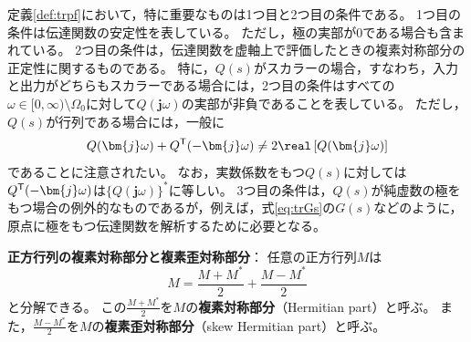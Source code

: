 \documentclass[tombow,dvipdfmx]{corona-a5-1.1}
\begin{document}
定義\ref{def:trpf}において，特に重要なものは1つ目と2つ目の条件である。
1つ目の条件は伝達関数の安定性を表している。
ただし，極の実部が0である場合も含まれている。
2つ目の条件は，伝達関数を虚軸上で評価したときの複素対称部分の正定性に関するものである。
特に，$Q(s)$がスカラーの場合，すなわち，入力と出力がどちらもスカラーである場合には，2つ目の条件はすべての$\omega \in [0,\infty)\setminus \Omega_0$に対して$Q(\bm{j}\omega)$の実部が非負であることを表している。
ただし，$Q(s)$が行列である場合には，一般に
\begin{align*}
Q(\bm{j} \omega) + Q^{\sf T}(-\bm{j} \omega) \neq 2 \real\left[ Q(\bm{j} \omega) \right]
\end{align*}
であることに注意されたい。
なお，実数係数をもつ$Q(s)$に対しては$Q^{\sf T}( -\bm{j} \omega)$は$\{Q(\bm{j} \omega)\}^*$に等しい。
3つ目の条件は，$Q(s)$が純虚数の極をもつ場合の例外的なものであるが，例えば，式\ref{eq:trGs}の$G(s)$などのように，原点に極をもつ伝達関数を解析するために必要となる。

\begin{COLUMN}
\noindent \textbf{正方行列の複素対称部分と複素歪対称部分}：
任意の正方行列$M$は
\[
M=\frac{M+M^*}{2}+\frac{M-M^*}{2}
\]
と分解できる。
この$\tfrac{M+M^*}{2}$を$M$の\textbf{複素対称部分}（Hermitian part）と呼ぶ。
また，$\tfrac{M-M^*}{2}$を$M$の\textbf{複素歪対称部分}（skew Hermitian part）と呼ぶ。
\end{COLUMN}
\end{document}
